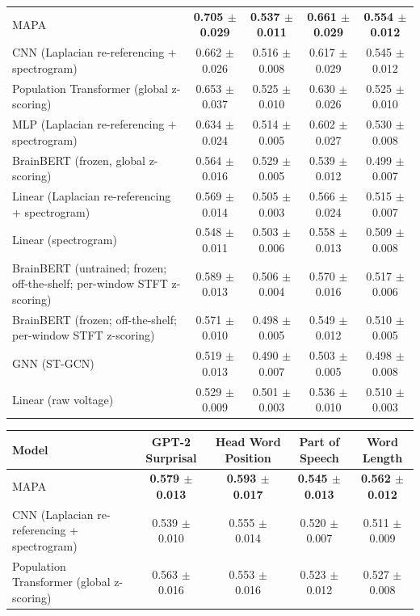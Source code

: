 \begin{table}[!htbp]
\begin{tabular}{>{\raggedright\arraybackslash}p{8cm}cccc}
\hline
MAPA & \textbf{0.705 $\pm$ 0.029} & \textbf{0.537 $\pm$ 0.011} & \textbf{0.661 $\pm$ 0.029} & \textbf{0.554 $\pm$ 0.012} \\
CNN (Laplacian re-referencing + spectrogram) & 0.662 $\pm$ 0.026 & 0.516 $\pm$ 0.008 & 0.617 $\pm$ 0.029 & 0.545 $\pm$ 0.012 \\
Population Transformer (global z-scoring) & 0.653 $\pm$ 0.037 & 0.525 $\pm$ 0.010 & 0.630 $\pm$ 0.026 & 0.525 $\pm$ 0.010 \\
MLP (Laplacian re-referencing + spectrogram) & 0.634 $\pm$ 0.024 & 0.514 $\pm$ 0.005 & 0.602 $\pm$ 0.027 & 0.530 $\pm$ 0.008 \\
BrainBERT (frozen, global z-scoring) & 0.564 $\pm$ 0.016 & 0.529 $\pm$ 0.005 & 0.539 $\pm$ 0.012 & 0.499 $\pm$ 0.007 \\
Linear (Laplacian re-referencing + spectrogram) & 0.569 $\pm$ 0.014 & 0.505 $\pm$ 0.003 & 0.566 $\pm$ 0.024 & 0.515 $\pm$ 0.007 \\
Linear (spectrogram) & 0.548 $\pm$ 0.011 & 0.503 $\pm$ 0.006 & 0.558 $\pm$ 0.013 & 0.509 $\pm$ 0.008 \\
BrainBERT (untrained; frozen; off-the-shelf; per-window STFT z-scoring) & 0.589 $\pm$ 0.013 & 0.506 $\pm$ 0.004 & 0.570 $\pm$ 0.016 & 0.517 $\pm$ 0.006 \\
BrainBERT (frozen; off-the-shelf; per-window STFT z-scoring) & 0.571 $\pm$ 0.010 & 0.498 $\pm$ 0.005 & 0.549 $\pm$ 0.012 & 0.510 $\pm$ 0.005 \\
GNN (ST-GCN) & 0.519 $\pm$ 0.013 & 0.490 $\pm$ 0.007 & 0.503 $\pm$ 0.005 & 0.498 $\pm$ 0.008 \\
Linear (raw voltage) & 0.529 $\pm$ 0.009 & 0.501 $\pm$ 0.003 & 0.536 $\pm$ 0.010 & 0.510 $\pm$ 0.003 \\
\hline
\end{tabular}
\hspace{1em}
\hspace*{-2.5cm}\begin{tabular}{>{\raggedright\arraybackslash}p{8cm}cccc}
\hline
Model & GPT-2 Surprisal & Head Word Position & Part of Speech & Word Length \\
\hline
MAPA & \textbf{0.579 $\pm$ 0.013} & \textbf{0.593 $\pm$ 0.017} & \textbf{0.545 $\pm$ 0.013} & \textbf{0.562 $\pm$ 0.012} \\
CNN (Laplacian re-referencing + spectrogram) & 0.539 $\pm$ 0.010 & 0.555 $\pm$ 0.014 & 0.520 $\pm$ 0.007 & 0.511 $\pm$ 0.009 \\
Population Transformer (global z-scoring) & 0.563 $\pm$ 0.016 & 0.553 $\pm$ 0.016 & 0.523 $\pm$ 0.012 & 0.527 $\pm$ 0.008 \\

\end{tabular}
\end{table}
